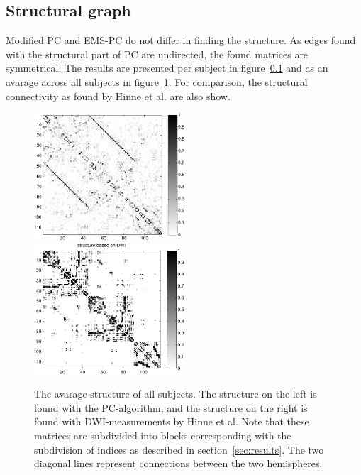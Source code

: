 \documentclass[a4paper, 10pt, english, onecolumn]{article}
\begin{document}
\subsection{Structural graph}
Modified PC and EMS-PC do not differ in finding the structure.
As edges found with the structural part of PC are undirected, the found matrices are symmetrical.
The results are presented per subject in figure~\ref{} and as an avarage across all subjects in figure~\ref{fig:struct_avg}. %
For comparison, the structural connectivity as found by Hinne et al.\cite{hinne2013} are also show. 

\begin{figure}[h!]
  \centering
  \includegraphics[width=0.5\textwidth]{images/struct_full}
  \includegraphics[width=0.5\textwidth]{images/structure_max}
  \caption{The avarage structure of all subjects. The structure on the left is found with the PC-algorithm, and the structure on the right is found with DWI-measurements by Hinne et al. Note that these matrices are subdivided into blocks corresponding with the subdivision of indices as described in section~\ref{sec:results}. The two diagonal lines represent connections between the two hemispheres.}
\label{fig:struct_avg}
\end{figure}
\end{document}
